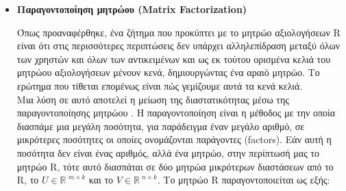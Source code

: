 \noindent
\begin{itemize}
	\item \textbf{Παραγοντοποίηση μητρώου (Matrix Factorization)}


\noindent Όπως προαναφέρθηκε, ένα ζήτημα που προκύπτει με το μητρώο αξιολογήσεων R είναι ότι στις περισσότερες περιπτώσεις δεν υπάρχει αλληλεπίδραση μεταξύ όλων των χρηστών και όλων των αντικειμένων και ως εκ τούτου ορισμένα κελιά του μητρώου αξιολογήσεων μένουν κενά, δημιουργώντας ένα αραιό μητρώο. Το ερώτημα που τίθεται επομένως είναι πώς γεμίζουμε αυτά τα κενά κελιά.\\
Μια λύση σε αυτό αποτελεί η μείωση της διαστατικότητας μέσω της παραγοντοποίησης μητρώου \cite{korenMatrixFactorizationTechniques2009}. Η παραγοντοποίηση είναι η μέθοδος με την οποία διασπάμε μια μεγάλη ποσότητα, για παράδειγμα έναν μεγάλο αριθμό, σε μικρότερες ποσότητες οι οποίες ονομάζονται παράγοντες (factors). Εάν αυτή η ποσότητα δεν είναι ένας αριθμός, αλλά ένα μητρώο, στην περίπτωσή μας το μητρώο R, τότε αυτό διασπάται σε δύο μητρώα μικρότερων διαστάσεων από το R, το $ U\in{\mathbb{R}\ }^{m\times k} $ και το $  V\in{\mathbb{R}\ }^{n\times k} $. Το μητρώο R παραγοντοποιείται ως εξής:\\


\end{itemize}
